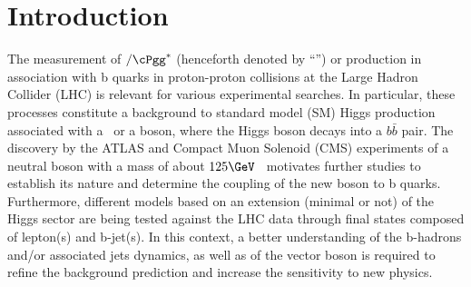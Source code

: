 \section{Introduction}
\label{sec:intro}

The measurement of \cPZ$/\cPgg^*$ (henceforth denoted by ``\cPZ'') or
\Wpm production in association with b quarks in proton-proton
collisions at the Large Hadron Collider (LHC) is relevant for various
experimental searches. In particular, these processes constitute a
background to standard model (SM) Higgs production associated with a
\cPZ~or a \Wpm boson, where the Higgs boson decays into a $b\bar{b}$
pair. The discovery by the ATLAS and Compact Muon Solenoid (CMS)
experiments of a neutral boson with a mass of about
$125\GeV$~\cite{Aad20121,:2012gu} motivates further studies to
establish its nature and determine the coupling of the new boson to b
quarks. Furthermore, different models based on an extension (minimal
or not) of the Higgs sector are being tested against the LHC data
through final states composed of lepton(s) and b-jet(s).  In this
context, a better understanding of the b-hadrons and/or associated
jets dynamics, as well as of the vector boson is required to refine
the background prediction and increase the sensitivity to new physics.

